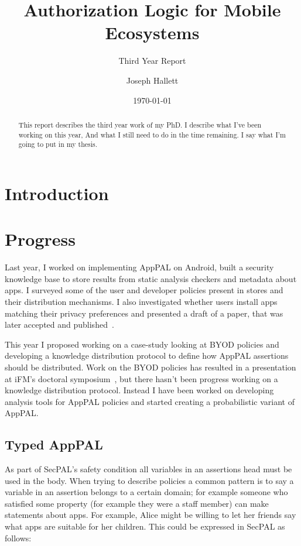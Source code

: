 \documentclass[a4paper]{scrartcl}
\title{Authorization Logic for Mobile Ecosystems}
\subtitle{Third Year Report}
\author{Joseph Hallett}
\date\today
\begin{document}
\maketitle

\begin{abstract}
  This report describes the third year work of my PhD.
  I describe what I've been working on this year,
  And what I still need to do in the time remaining.
  I say what I'm going to put in my thesis.
\end{abstract}

\section{Introduction}
\label{sec:introduction}

\section{Progress}
\label{sec:work}

Last year, I worked on implementing AppPAL on Android, built a security
knowledge base to store results from static analysis checkers and metadata about
apps. I surveyed some of the user and developer policies present in stores and
their distribution mechanisms. I also investigated whether users install apps
matching their privacy preferences and presented a draft of a paper, that was
later accepted and published~\cite{hallett_apppal_2016}.

This year I proposed working on a case-study looking at BYOD policies and
developing a knowledge distribution protocol to define how AppPAL assertions
should be distributed.  Work on the BYOD policies has resulted in a presentation
at iFM's doctoral symposium~\cite{hallett_specifying_2016}, but there hasn't
been progress working on a knowledge distribution protocol.  Instead I have been
worked on developing analysis tools for AppPAL policies and started creating a
probabilistic variant of AppPAL.

\subsection{Typed AppPAL}
\label{sec:types}

As part of SecPAL's safety condition all variables in an assertions head must be
used in the body. When trying to describe policies a common pattern is to say a
variable in an assertion belongs to a certain domain; for example someone who
satisfied some property (for example they were a staff member) can make
statements about apps.
For example, Alice might be willing to let her friends say what apps are
suitable for her children.  This could be expressed in SecPAL as follows:
\end{document}
